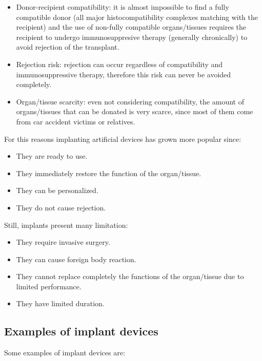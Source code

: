 \begin{multicols}{2}
  \begin{itemize}
    \item Donor-recipient compatibility: it is almost impossible to find a fully compatible donor (all major histocompatibility complexes matching with the recipient) and the use of non-fully compatible organs/tissues requires the recipient to undergo immunosuppresive therapy (generally chronically) to avoid rejection of the transplant.
    \item Rejection risk: rejection can occur regardless of compatibility and immunosuppressive therapy, therefore this risk can never be avoided completely.
    \item Organ/tissue scarcity: even not considering compatibility, the amount of organs/tissues that can be donated is very scarce, since most of them come from car accident victims or relatives.
  \end{itemize}
\end{multicols}

For this reasons implanting artificial devices has grown more popular since:

\begin{multicols}{2}
  \begin{itemize}
    \item They are ready to use.
    \item They immediately restore the function of the organ/tissue.
    \item They can be personalized.
    \item They do not cause rejection.
  \end{itemize}
\end{multicols}

Still, implants present many limitation:

\begin{multicols}{2}
  \begin{itemize}
    \item They require invasive surgery.
    \item They can cause foreign body reaction.
    \item They cannot replace completely the functions of the organ/tissue due to limited performance.
    \item They have limited duration.
  \end{itemize}
\end{multicols}

  \subsection{Examples of implant devices}
  Some examples of implant devices are:

